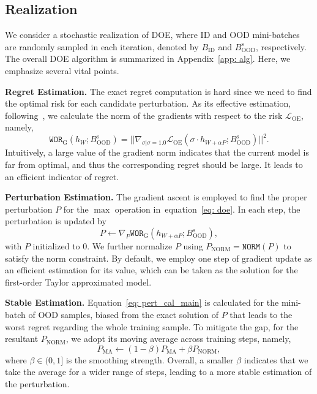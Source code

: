 \documentclass{article} \usepackage{iclr2022_conference,times}
\def\eqref#1{equation~\ref{#1}}
\def\Eqref#1{Equation~\ref{#1}}
\begin{document}
\subsection{Realization} 

We consider a stochastic realization of DOE, where ID and OOD mini-batches are randomly sampled in each iteration, denoted by $B_\text{ID}$ and $B_\text{OOD}^\text{s}$, respectively. The overall DOE algorithm is summarized in Appendix~\ref{app: alg}. Here, we emphasize several vital points.




\textbf{Regret Estimation.} The exact regret computation is hard since we need to find the optimal risk for each candidate perturbation. As its effective estimation, following~\citep{arjovsky2019invariant,AgarwalZ22}, we calculate the norm of the gradients with respect to the risk $\mathcal{L}_\text{OE}$, namely,
\begin{equation}
    {\texttt{WOR}}_\text{G}(h_{W}; B_\text{OOD}^\text{s}) = \lvert\lvert\nabla_{\sigma | \sigma = 1.0} \mathcal{L}_\text{OE}( \sigma \cdot h_{W+ \alpha P}; B^\text{s}_\text{OOD})  \rvert\rvert^2.
\end{equation}
{Intuitively, a large value of the gradient norm indicates that the current model is far from optimal, and thus the corresponding regret should be large. It leads to an efficient indicator of regret. }

\textbf{Perturbation Estimation.} The gradient ascent is employed to find the proper perturbation $P$ for the $\max$ operation in~\eqref{eq: doe}. In each step, the perturbation is updated by
\begin{equation}
    {P} \leftarrow \nabla_{P} {\texttt{WOR}}_\text{G}(h_{W+\alpha P}; B_\text{OOD}^\text{s}), \label{eq: pert_cal_main}
\end{equation}
with $P$ initialized to $0$. We further normalize $P$ using ${P}_\text{NORM}=\texttt{NORM}({P})$ to satisfy the norm constraint. By default, we employ one step of gradient update as an efficient estimation for its value, which can be taken as the solution for the first-order Taylor approximated model. 


\textbf{Stable Estimation.} \Eqref{eq: pert_cal_main} is calculated for the mini-batch of OOD samples, biased from the exact solution of $P$ that leads to the worst regret regarding the whole training sample. To mitigate the gap, for the resultant ${P}_\text{NORM}$, we adopt its moving average across training steps, namely,
\begin{equation}
    P_\text{MA} \leftarrow (1-\beta) P_\text{MA} + \beta {P}_\text{NORM},
\end{equation}
where $\beta\in(0,1]$ is the smoothing strength. Overall, a smaller $\beta$ indicates that we take the average for a wider range of steps, leading to a more stable estimation of the perturbation. 
\end{document}
